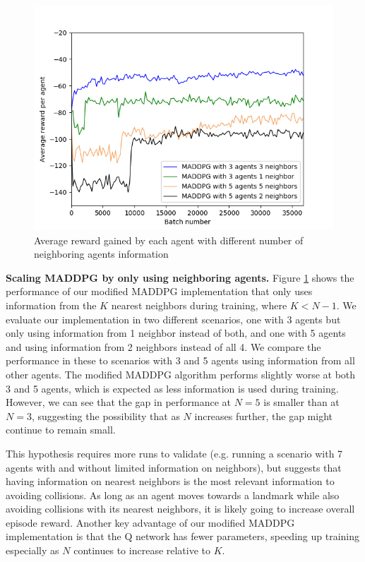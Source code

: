 \documentclass{article}
\begin{document}
\begin{figure}
\begin{center}
\includegraphics[scale=0.45]{MADDPG_different_neighbors.png}
\end{center}
\caption{Average reward gained by each agent with different number of neighboring agents information}
\label{fig:avg_reward_different_neighbors}
\end{figure}


\textbf{Scaling MADDPG by only using neighboring agents.} Figure \ref{fig:avg_reward_different_neighbors} shows the performance of our modified MADDPG implementation that only uses information from the $K$ nearest neighbors during training, where $K < N-1$. We evaluate our implementation in two different scenarios, one with 3 agents but only using information from 1 neighbor instead of both, and one with 5 agents and using information from 2 neighbors instead of all 4. We compare the performance in these to scenarios with 3 and 5 agents using information from all other agents. The modified MADDPG algorithm performs slightly worse at both 3 and 5 agents, which is expected as less information is used during training. However, we can see that the gap in performance at $N=5$ is smaller than at $N=3$, suggesting the possibility that as $N$ increases further, the gap might continue to remain small.

This hypothesis requires more runs to validate (e.g. running a scenario with 7 agents with and without limited information on neighbors), but suggests that having information on nearest neighbors is the most relevant information to avoiding collisions. As long as an agent moves towards a landmark while also avoiding collisions with its nearest neighbors, it is likely going to increase overall episode reward. Another key advantage of our modified MADDPG implementation is that the Q network has fewer parameters, speeding up training especially as $N$ continues to increase relative to $K$.
\end{document}
